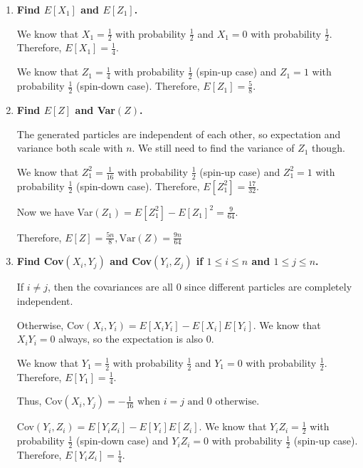 \documentclass{article}
\begin{document}
\begin{enumerate}[label=(\alph*)]
    \item \textbf{Find $E[X_1]$ and $E[Z_1]$.}
    
    We know that $X_1 = \frac{1}{2}$ with probability $\frac{1}{2}$ and $X_1 = 0$ with probability $\frac{1}{2}$. Therefore, $\boxed{E[X_1] = \frac{1}{4}}$.
    
    We know that $Z_1 = \frac{1}{4}$ with probability $\frac{1}{2}$ (spin-up case) and $Z_1 = 1$ with probability $\frac{1}{2}$ (spin-down case). Therefore, $\boxed{E[Z_1] = \frac{5}{8}}$.

    \vspace{2cm}
    
    \item \textbf{Find $E[Z]$ and Var$(Z)$.}
    
    The generated particles are independent of each other, so expectation and variance both scale with $n$. We still need to find the variance of $Z_1$ though.
    
    We know that $Z_1^2 = \frac{1}{16}$ with probability $\frac{1}{2}$ (spin-up case) and $Z_1^2 = 1$ with probability $\frac{1}{2}$ (spin-down case). Therefore, $E[Z_1^2] = \frac{17}{32}$.
    
    Now we have Var$(Z_1) = E[Z_1^2] - E[Z_1]^2 = \frac{9}{64}$.
    
    Therefore, $\boxed{E[Z] = \frac{5n}{8}, \text{Var}(Z) = \frac{9n}{64}}$

    \vspace{2cm}
    
    \item \textbf{Find Cov$(X_i, Y_j)$ and Cov$(Y_i, Z_j)$ if $1 \leq i \leq n$ and $1 \leq j \leq n$.}
    
    If $i \neq j$, then the covariances are all $0$ since different particles are completely independent.
    
    Otherwise, Cov$(X_i, Y_i) = E[X_iY_i] - E[X_i]E[Y_i]$. We know that $X_iY_i = 0$ always, so the expectation is also $0$.
    
    We know that $Y_1 = \frac{1}{2}$ with probability $\frac{1}{2}$ and $Y_1 = 0$ with probability $\frac{1}{2}$. Therefore, $E[Y_1] = \frac{1}{4}$.
    
    Thus, $\boxed{\text{Cov}(X_i, Y_j) = -\frac{1}{16} \text{ when } i = j \text{ and 0 otherwise.}}$
    
    Cov$(Y_i, Z_i) = E[Y_iZ_i] - E[Y_i]E[Z_i]$. We know that $Y_iZ_i = \frac{1}{2}$ with probability $\frac{1}{2}$ (spin-down case) and $Y_iZ_i = 0$ with probability $\frac{1}{2}$ (spin-up case). Therefore, $E[Y_iZ_i] = \frac{1}{4}$.
    

\end{enumerate}
\end{document}
